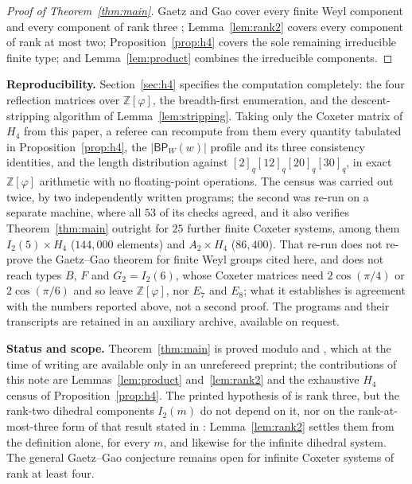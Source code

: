 \documentclass[11pt]{amsart}
\newcommand{\BP}{\mathsf{BP}}
\begin{document}
\begin{proof}[Proof of Theorem~\ref{thm:main}]
Gaetz and Gao cover every finite Weyl component
\cite[Theorem~1.2]{GaetzGao} and every component of rank three
\cite[Theorem~3.15]{GaetzGao}; Lemma~\ref{lem:rank2} covers every component
of rank at most two; Proposition~\ref{prop:h4} covers the sole remaining
irreducible finite type; and Lemma~\ref{lem:product} combines the
irreducible components.
\end{proof}

\medskip
\noindent\textbf{Reproducibility.}
Section~\ref{sec:h4} specifies the computation completely: the four
reflection matrices over $\mathbb Z[\varphi]$, the breadth-first
enumeration, and the descent-stripping algorithm of
Lemma~\ref{lem:stripping}. Taking only the Coxeter matrix of $H_4$ from
this paper, a referee can recompute from them every quantity tabulated in
Proposition~\ref{prop:h4}, the $|\BP_W(w)|$ profile and its three
consistency identities, and the length distribution against
$[2]_q[12]_q[20]_q[30]_q$, in exact $\mathbb Z[\varphi]$ arithmetic with no
floating-point operations. The census was carried out twice, by two
independently written programs; the second was re-run on a separate
machine, where all $53$ of its checks agreed, and it also verifies
Theorem~\ref{thm:main} outright for $25$ further finite Coxeter systems,
among them $I_2(5)\times H_4$ ($144{,}000$ elements) and $A_2\times H_4$
($86{,}400$). That re-run does not re-prove the Gaetz--Gao theorem for
finite Weyl groups cited here, and does not reach types $B$, $F$ and
$G_2=I_2(6)$, whose Coxeter matrices need $2\cos(\pi/4)$ or $2\cos(\pi/6)$
and so leave $\mathbb Z[\varphi]$, nor $E_7$ and $E_8$; what it establishes
is agreement with the numbers reported above, not a second proof. The programs and their transcripts are retained in an auxiliary
archive, available on request.

\medskip
\noindent\textbf{Status and scope.}
Theorem~\ref{thm:main} is proved modulo
\cite[Theorem~1.2]{GaetzGao} and \cite[Theorem~3.15]{GaetzGao}, which at the
time of writing are available only in an unrefereed preprint; the
contributions of this note are Lemmas~\ref{lem:product} and~\ref{lem:rank2}
and the exhaustive $H_4$ census of Proposition~\ref{prop:h4}. The printed
hypothesis of \cite[Theorem~3.15]{GaetzGao} is rank three, but the rank-two
dihedral components $I_2(m)$ do not depend on it, nor on the
rank-at-most-three form of that result stated in
\cite[Section~1]{GaetzGao}: Lemma~\ref{lem:rank2} settles them from the
definition alone, for every $m$, and likewise for the infinite dihedral
system. The general Gaetz--Gao conjecture remains open for infinite Coxeter
systems of rank at least four.
\end{document}

